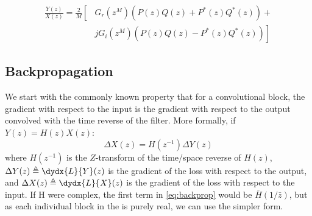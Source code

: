 \documentclass[9pt]{article}
\begin{document}
\begin{equation}\label{eq:end_to_end2}
  \begin{split}
    \frac{Y(z)}{X(z)} = \frac{2}{M} \left[ \right. & G_r(z^M) \left( P(z)Q(z) + P^*(z)Q^*(z) \right) +  \\ 
     & \left. jG_i(z^M) \left(P(z)Q(z)-P^*(z)Q^*(z) \right) \right]
  \end{split}
\end{equation}\begin{table*}[]
\end{table*}\subsection{Backpropagation}
We start with the commonly known property that for a convolutional block, the gradient with respect to the input is the gradient with
respect to the output convolved with the time reverse of the filter. More formally, if $Y(z) = H(z) X(z)$:
\begin{equation}\label{eq:backprop}
\Delta X(z) = H(z^{-1}) \Delta Y(z)
\end{equation}
where $H(z^{-1})$ is the $Z$-transform of the time/space reverse of $H(z)$, $\Delta Y(z)
\triangleq \dydx{L}{Y}(z)$ is the gradient of the loss with respect to the output, and
$\Delta X(z) \triangleq \dydx{L}{X}(z)$ is the gradient of the loss with respect to the input. If 
H were complex, the first term in \autoref{eq:backprop} would be $\bar{H}(1/\bar{z})$, but as each individual block
in the \DTCWT is purely real, we can use the simpler form. 
\end{document}
